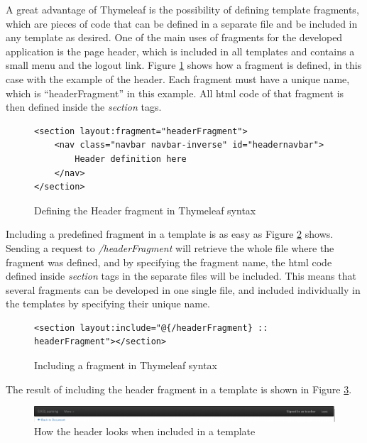 \documentclass{llncs}
\begin{document}
A great advantage of Thymeleaf is the possibility of defining template fragments, which are pieces of code that can be defined in a separate file and be included in any template as desired. One of the main uses of fragments for the developed application is the page header, which is included in all templates and contains a small menu and the logout link. Figure \ref{figure:viewsHeaderFragment} shows how a fragment is defined, in this case with the example of the header. Each fragment must have a unique name, which is ``headerFragment'' in this example. All html code of that fragment is then defined inside the \textit{section} tags.
\begin{figure}
\lstset{style=customhtml}
\begin{lstlisting}
<section layout:fragment="headerFragment">
	<nav class="navbar navbar-inverse" id="headernavbar">
		Header definition here	
	</nav>
</section>
\end{lstlisting}
\caption{Defining the Header fragment in Thymeleaf syntax}
\label{figure:viewsHeaderFragment}
\end{figure}

Including a predefined fragment in a template is as easy as Figure \ref{figure:viewsIncludeFragment} shows. Sending a request to \textit{/headerFragment} will retrieve the whole file where the fragment was defined, and by specifying the fragment name, the html code defined inside \textit{section} tags in the separate files will be included. This means that several fragments can be developed in one single file, and included individually in the templates by specifying their unique name.
\begin{figure}
\lstset{style=customhtml}
\begin{lstlisting}
<section layout:include="@{/headerFragment} :: headerFragment"></section>
\end{lstlisting}
\caption{Including a fragment in Thymeleaf syntax}
\label{figure:viewsIncludeFragment}
\end{figure}

The result of including the header fragment in a template is shown in Figure \ref{figure:viewsHeaderLooks}.

\begin{figure}
\centering
\includegraphics[scale=0.4]{images/header}
\caption{How the header looks when included in a template}
\label{figure:viewsHeaderLooks}
\end{figure}
\end{document}
